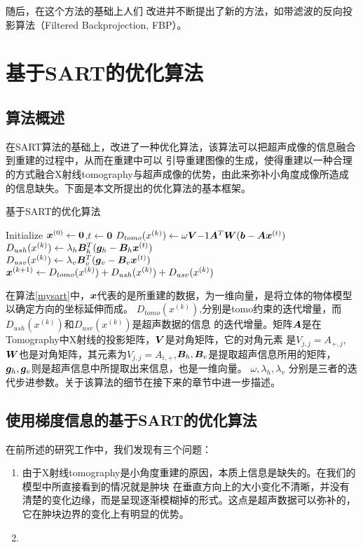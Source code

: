 随后，在这个方法的基础上人们
改进并不断提出了新的方法，如带滤波的反向投影算法（Filtered Backprojection, FBP）\cite{kak1979computerized}。

\chapter{基于SART的优化算法}
\section{算法概述}
在SART算法的基础上，改进了一种优化算法，该算法可以把超声成像的信息融合到重建的过程中，从而在重建中可以
引导重建图像的生成，使得重建以一种合理的方式融合X射线tomography与超声成像的优势，由此来弥补小角度成像所造成
的信息缺失。下面是本文所提出的优化算法的基本框架。
\begin{algo}\label{mysart}
基于SART的优化算法
\begin{algorithmic}[1]
\STATE
Initialize $\bm{ x}^{(0)} \leftarrow \bm{0}$,$t\leftarrow \bm{0}$
\REPEAT
\STATE
$D_{tomo}(x^{(k)}) \leftarrow \omega \bm{ V}{-1}\bm{ A}^T\bm{ W}(\bm{b}-\bm{ A}\bm{ x}^{(t)})$ \\
$D_{ush}(x^{(k)}) \leftarrow \lambda_h\bm{ B}^{T}_h(\bm{ g}_h-\bm{ B}_h\bm{ x}^{(t)})$ \\
$ D_{usv}(x^{(k)}) \leftarrow \lambda_v\bm{ B}^{T}_v(\bm{ g}_v-\bm{ B}_v\bm{ x}^{(t)})$
\STATE
$\bm{ x}^{(k+1)}\leftarrow D_{tomo}(x^{(k)}) + D_{ush}(x^{(k)}) + D_{usv}(x^{(k)})    $
\end{algorithmic}
\end{algo}

在算法\ref{mysart}中，$\bm{ x}$代表的是所重建的数据，为一维向量，是将立体的物体模型以确定方向的坐标延伸而成。
$D_{tomo}(x^{(k)})$,分别是tomo约束的迭代增量，而$D_{ush}(x^{(k)})$和$ D_{usv}(x^{(k)})$是超声数据的信息
的迭代增量。矩阵$\bm{ A}$是在Tomography中X射线的投影矩阵，$\bm{ V}$是对角矩阵，它的对角元素
是$V_{j,j}=A_{+,j}$,$\bm{ W}$也是对角矩阵，其元素为$V_{j,j}=A_{i,+}$,$\bm{ B}_h,\bm{ B}_v$是提取超声信息所用的矩阵，
$\bm{ g}_h,\bm{ g}_v$则是超声信息中所提取出来信息，也是一维向量。
$\omega,\lambda_h,\lambda_v$
分别是三者的迭代步进参数。关于该算法的细节在接下来的章节中进一步描述。
\section{使用梯度信息的基于SART的优化算法}
在前所述的研究工作中，我们发现有三个问题：
\begin{enumerate}
    \item 由于X射线tomography是小角度重建的原因，本质上信息是缺失的。在我们的模型中所直接看到的情况就是肿块
    在垂直方向上的大小变化不清晰，并没有清楚的变化边缘，而是呈现逐渐模糊掉的形式。这点是超声数据可以弥补的，
    它在肿块边界的变化上有明显的优势。
    \item 
\end{enumerate}






